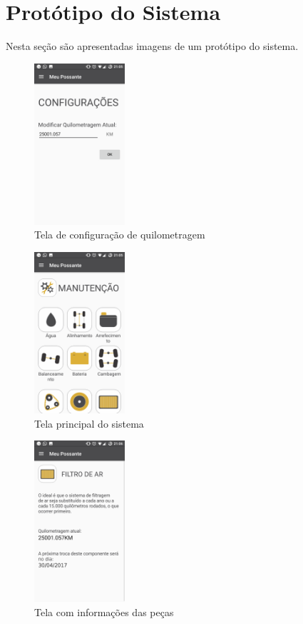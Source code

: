 \documentclass[12pt]{article}
\begin{document}
\section{Protótipo do Sistema}

Nesta seção são apresentadas imagens de um protótipo do sistema.

\begin{figure}[]
\centering
\includegraphics[width=0.3\textwidth]{tela1}
\caption{Tela de configuração de quilometragem}
\label{figura-quilometragem}
\end{figure}

\begin{figure}[]
\centering
\includegraphics[width=0.3\textwidth]{tela2}
\caption{Tela principal do sistema}
\label{figura-sistema}
\end{figure}

\begin{figure}[]
\centering
\includegraphics[width=0.3\textwidth]{tela3}
\caption{Tela com informações das peças}
\label{figura-componente}
\end{figure}


%
\end{document}
